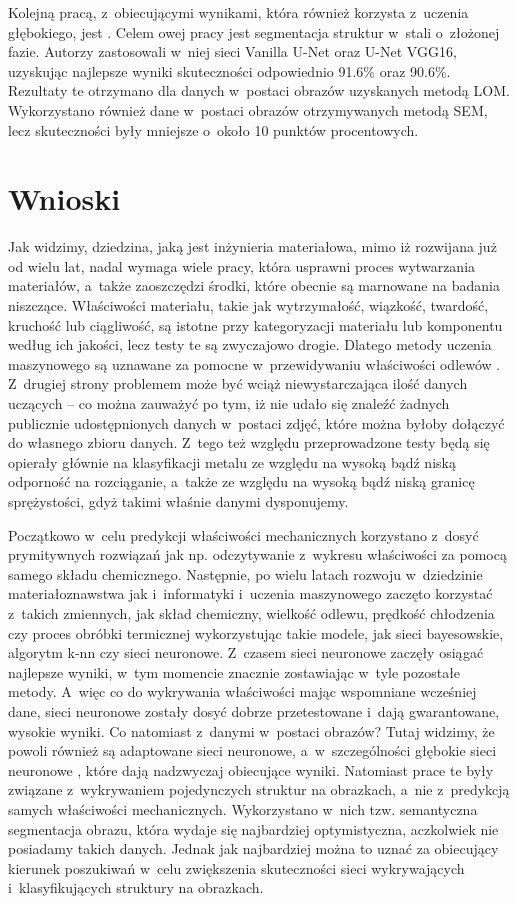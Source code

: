 Kolejną pracą, z~obiecującymi wynikami, która również korzysta z~uczenia głębokiego, jest \cite{Durmaz21}. Celem owej pracy jest segmentacja struktur w~stali o~złożonej fazie. Autorzy zastosowali w~niej sieci Vanilla U-Net oraz U-Net VGG16, uzyskując najlepsze wyniki skuteczności odpowiednio 91.6\% oraz 90.6\%. Rezultaty te otrzymano dla danych w~postaci obrazów uzyskanych metodą LOM. Wykorzystano również dane w~postaci obrazów otrzymywanych metodą SEM, lecz skuteczności były mniejsze o~około 10 punktów procentowych.

\section{Wnioski}
\label{cha2.3}

Jak widzimy, dziedzina, jaką jest inżynieria materiałowa, mimo iż rozwijana już od wielu lat, nadal wymaga wiele pracy, która usprawni proces wytwarzania materiałów, a~także zaoszczędzi środki, które obecnie są marnowane na badania niszczące. Właściwości materiału, takie jak wytrzymałość, wiązkość, twardość, kruchość lub ciągliwość, są istotne przy kategoryzacji materiału lub komponentu według ich jakości, lecz testy te są zwyczajowo drogie. Dlatego metody uczenia maszynowego są uznawane za pomocne w~przewidywaniu właściwości odlewów \cite{Stoll21}. Z~drugiej strony problemem może być wciąż niewystarczająca ilość danych uczących –  co można zauważyć po tym, iż nie udało się znaleźć żadnych publicznie udostępnionych danych w~postaci zdjęć, które można byłoby dołączyć do własnego zbioru danych. Z~tego też względu przeprowadzone testy będą się opierały głównie na klasyfikacji metalu ze względu na wysoką bądź niską odporność na rozciąganie, a~także ze względu na wysoką bądź niską granicę sprężystości, gdyż takimi właśnie danymi dysponujemy.

Początkowo w~celu predykcji właściwości mechanicznych korzystano z~dosyć prymitywnych rozwiązań jak np. odczytywanie z~wykresu właściwości za pomocą samego składu chemicznego. Następnie, po wielu latach rozwoju w~dziedzinie materiałoznawstwa jak i~informatyki i~uczenia maszynowego zaczęto korzystać z~takich zmiennych, jak skład chemiczny, wielkość odlewu, prędkość chłodzenia czy proces obróbki termicznej wykorzystując takie modele, jak sieci bayesowskie, algorytm k-nn czy sieci neuronowe. Z~czasem sieci neuronowe zaczęły osiągać najlepsze wyniki, w~tym momencie znacznie zostawiając w~tyle pozostałe metody. A~więc co do wykrywania właściwości mając wspomniane wcześniej dane, sieci neuronowe zostały dosyć dobrze przetestowane i~dają gwarantowane, wysokie wyniki. Co natomiast z~danymi w~postaci obrazów? Tutaj widzimy, że powoli również są adaptowane sieci neuronowe, a~w~szczególności głębokie sieci neuronowe \cite{Azimi18, Pauly16}, które dają nadzwyczaj obiecujące wyniki. Natomiast prace te były związane z~wykrywaniem pojedynczych struktur na obrazkach, a~nie z~predykcją samych właściwości mechanicznych. Wykorzystano w~nich tzw. semantyczna segmentacja obrazu, która wydaje się najbardziej optymistyczna, aczkolwiek nie posiadamy takich danych. Jednak jak najbardziej można to uznać za obiecujący kierunek poszukiwań w~celu zwiększenia skuteczności sieci wykrywających i~klasyfikujących struktury na obrazkach.

